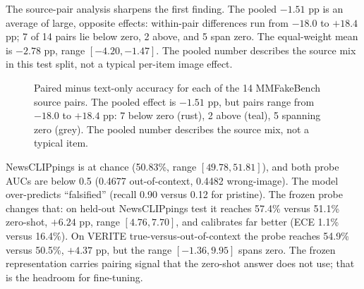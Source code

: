 \documentclass[11pt]{article}
\begin{document}
The source-pair analysis sharpens the first finding. The pooled $-1.51$ pp is an average of large, opposite effects: within-pair differences run from $-18.0$ to $+18.4$ pp; 7 of 14 pairs lie below zero, 2 above, and 5 span zero. The equal-weight mean is $-2.78$ pp, range $[-4.20, -1.47]$. The pooled number describes the source mix in this test split, not a typical per-item image effect.

\begin{figure}[t]
\centering
{}
\caption{Paired minus text-only accuracy for each of the 14 MMFakeBench source pairs. The pooled effect is $-1.51$ pp, but pairs range from $-18.0$ to $+18.4$ pp: 7 below zero (rust), 2 above (teal), 5 spanning zero (grey). The pooled number describes the source mix, not a typical item.}
\label{fig:pairs}
\end{figure}


NewsCLIPpings is at chance (50.83\%, range $[49.78, 51.81]$), and both probe AUCs are below 0.5 (0.4677 out-of-context, 0.4482 wrong-image). The model over-predicts ``falsified'' (recall 0.90 versus 0.12 for pristine). The frozen probe changes that: on held-out NewsCLIPpings test it reaches 57.4\% versus 51.1\% zero-shot, $+6.24$ pp, range $[4.76, 7.70]$, and calibrates far better (ECE 1.1\% versus 16.4\%). On VERITE true-versus-out-of-context the probe reaches 54.9\% versus 50.5\%, $+4.37$ pp, but the range $[-1.36, 9.95]$ spans zero. The frozen representation carries pairing signal that the zero-shot answer does not use; that is the headroom for fine-tuning.
\end{document}
